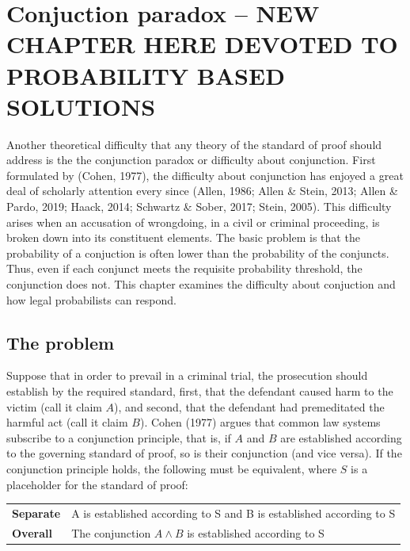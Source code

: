\documentclass[10pt,dvipsnames,enabledeprecatedfontcommands]{scrartcl}
\newcommand{\et}{\wedge}
\begin{document}
\section{Conjuction paradox -- NEW CHAPTER HERE DEVOTED TO PROBABILITY
BASED
SOLUTIONS}\label{conjuction-paradox-new-chapter-here-devoted-to-probability-based-solutions}

Another theoretical difficulty that any theory of the standard of proof
should address is the the conjunction paradox or difficulty about
conjunction. First formulated by (Cohen, 1977), the difficulty about
conjunction has enjoyed a great deal of scholarly attention every since
(Allen, 1986; Allen \& Stein, 2013; Allen \& Pardo, 2019; Haack, 2014;
Schwartz \& Sober, 2017; Stein, 2005). This difficulty arises when an
accusation of wrongdoing, in a civil or criminal proceeding, is broken
down into its constituent elements. The basic problem is that the
probability of a conjuction is often lower than the probability of the
conjuncts. Thus, even if each conjunct meets the requisite probability
threshold, the conjunction does not. This chapter examines the
difficulty about conjuction and how legal probabilists can respond.

\subsection{The problem}\label{the-problem}

Suppose that in order to prevail in a criminal trial, the prosecution
should establish by the required standard, first, that the defendant
caused harm to the victim (call it claim \(A\)), and second, that the
defendant had premeditated the harmful act (call it claim \(B\)). Cohen
(1977) argues that common law systems subscribe to a conjunction
principle, that is, if \(A\) and \(B\) are established according to the
governing standard of proof, so is their conjunction (and vice versa).
If the conjunction principle holds, the following must be equivalent,
where \(S\) is a placeholder for the standard of proof:

\begin{center}
\begin{tabular}
{@{}ll@{}}
\toprule
\textbf{Separate} &   A is established according to S and B is established according to S\\   
\textbf{Overall}  &   The conjunction $A \et B$ is established according to S  \\ 
\bottomrule
\end{tabular}
\end{center}
\end{document}
